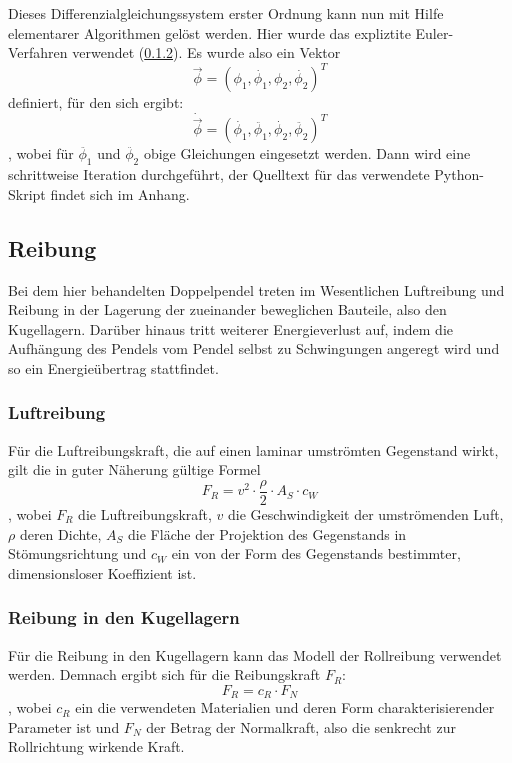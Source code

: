 Dieses Differenzialgleichungssystem erster Ordnung kann nun mit Hilfe elementarer Algorithmen gelöst werden. Hier wurde das expliztite Euler-Verfahren verwendet (\ref{}). Es wurde also ein Vektor $$ \vec{\phi} = (
\phi_1, \dot{\phi_1}, \phi_2 , \dot{\phi_2})^{T} $$ 
 definiert, für den sich ergibt: 
\begin{equation}
\dot{\vec{\phi}} = (\dot{\phi_1}, \ddot{\phi_1}, \dot{\phi_2}, \ddot{\phi_2})^{T}
\end{equation}
, wobei für $ \ddot{\phi_1} $ und $ \ddot{\phi_2} $ obige Gleichungen eingesetzt werden. 
Dann wird eine schrittweise Iteration durchgeführt, der Quelltext für das verwendete Python-Skript findet sich im Anhang. 

\subsection{Reibung}
Bei dem hier behandelten Doppelpendel treten im Wesentlichen Luftreibung und Reibung in der Lagerung der zueinander beweglichen Bauteile, also den Kugellagern. Darüber hinaus tritt weiterer Energieverlust auf, indem die Aufhängung des Pendels vom Pendel selbst zu Schwingungen angeregt wird und so ein Energieübertrag stattfindet. 

\subsubsection{Luftreibung}
Für die Luftreibungskraft, die auf einen laminar umströmten Gegenstand wirkt, gilt die in guter Näherung gültige Formel
\begin{equation}
F_R = v^2 \cdot \frac{\rho}{2} \cdot A_S \cdot c_W
\end{equation}, 
wobei $ F_R $ die Luftreibungskraft, $ v $ die Geschwindigkeit der umströmenden Luft, $ \rho $ deren Dichte, $ A_S $ die Fläche der Projektion des Gegenstands in Stömungsrichtung und $ c_W $ ein von der Form des Gegenstands bestimmter, dimensionsloser Koeffizient ist. 


\subsubsection{Reibung in den Kugellagern}
Für die Reibung in den Kugellagern kann das Modell der Rollreibung verwendet werden. Demnach ergibt sich für die Reibungskraft $ F_R $:
\begin{equation}
F_R = c_R \cdot F_N
\end{equation}, 
wobei $ c_R $ ein die verwendeten Materialien und deren Form charakterisierender Parameter ist und $ F_N $ der Betrag der Normalkraft, also die senkrecht zur Rollrichtung wirkende Kraft. 

